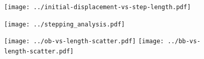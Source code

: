 \documentclass[]{article}
\begin{document}
\begin{figure}[tbhp]
  \texttt{[image: ../initial-displacement-vs-step-length.pdf]}
\end{figure}

\begin{figure}[tbhp]
  \texttt{[image: ../stepping\_analysis.pdf]}
\end{figure}

\begin{figure}[tbhp]
  \texttt{[image: ../ob-vs-length-scatter.pdf]}%
  \texttt{[image: ../bb-vs-length-scatter.pdf]}
\end{figure}



\end{document}

